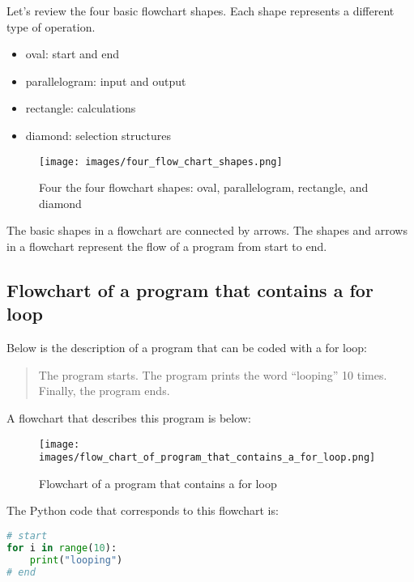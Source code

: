 \documentclass{book}
\makeatletter
\def\maxwidth{\ifdim\Gin@nat@width>\linewidth\linewidth
\else\Gin@nat@width\fi}
\let\Oldincludegraphics\includegraphics
\renewcommand{\includegraphics}[1]{\Oldincludegraphics[width=.8\maxwidth]{#1}}
\providecommand{\tightlist}{%
      \setlength{\itemsep}{0pt}\setlength{\parskip}{0pt}}
\makeatother
\begin{document}
    
        Let's review the four basic flowchart shapes. Each shape represents a
different type of operation.

\begin{itemize}
\tightlist
\item
  oval: start and end
\item
  parallelogram: input and output
\item
  rectangle: calculations
\item
  diamond: selection structures
\end{itemize}

\begin{figure}
\centering
\texttt{[image: images/four\_flow\_chart\_shapes.png]}
\caption{Four the four flowchart shapes: oval, parallelogram, rectangle,
and diamond}
\end{figure}

The basic shapes in a flowchart are connected by arrows. The shapes and
arrows in a flowchart represent the flow of a program from start to end.
    




    
        \hypertarget{flowchart-of-a-program-that-contains-a-for-loop}{%
\subsection{Flowchart of a program that contains a for
loop}\label{flowchart-of-a-program-that-contains-a-for-loop}}
    




    
        Below is the description of a program that can be coded with a for loop:

\begin{quote}
The program starts. The program prints the word ``looping'' 10 times.
Finally, the program ends.
\end{quote}

A flowchart that describes this program is below:

\begin{figure}
\centering
\texttt{[image: images/flow\_chart\_of\_program\_that\_contains\_a\_for\_loop.png]}
\caption{Flowchart of a program that contains a for loop}
\end{figure}

The Python code that corresponds to this flowchart is:

\begin{lstlisting}[language=Python]
# start
for i in range(10):
    print("looping")
# end
\end{lstlisting}
    
\end{document}
